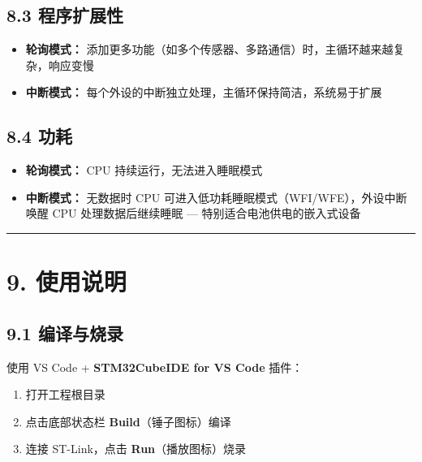 \documentclass[
  chinese,
  UTF8,
  oneside,
  openany]{ctexbook}
\providecommand{\tightlist}{%
  \setlength{\itemsep}{0pt}\setlength{\parskip}{0pt}}
\begin{document}
\subsection{8.3 程序扩展性}\label{ux7a0bux5e8fux6269ux5c55ux6027}

\begin{itemize}
\tightlist
\item
  \textbf{轮询模式：}
  添加更多功能（如多个传感器、多路通信）时，主循环越来越复杂，响应变慢
\item
  \textbf{中断模式：}
  每个外设的中断独立处理，主循环保持简洁，系统易于扩展
\end{itemize}

\subsection{8.4 功耗}\label{ux529fux8017}

\begin{itemize}
\tightlist
\item
  \textbf{轮询模式：} CPU 持续运行，无法进入睡眠模式
\item
  \textbf{中断模式：} 无数据时 CPU
  可进入低功耗睡眠模式（WFI/WFE），外设中断唤醒 CPU 处理数据后继续睡眠
  --- 特别适合电池供电的嵌入式设备
\end{itemize}

\begin{center}\rule{0.5\linewidth}{0.5pt}\end{center}

\section{9. 使用说明}\label{ux4f7fux7528ux8bf4ux660e-1}

\subsection{9.1 编译与烧录}\label{ux7f16ux8bd1ux4e0eux70e7ux5f55-1}

使用 VS Code + \textbf{STM32CubeIDE for VS Code} 插件：

\begin{enumerate}
\def\labelenumi{\arabic{enumi}.}
\tightlist
\item
  打开工程根目录
\item
  点击底部状态栏 \textbf{Build}（锤子图标）编译
\item
  连接 ST-Link，点击 \textbf{Run}（播放图标）烧录
\end{enumerate}
\end{document}
